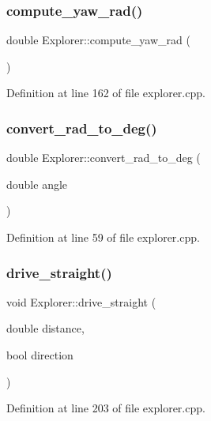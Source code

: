 \subsubsection{\texorpdfstring{compute\+\_\+yaw\+\_\+rad()}{compute\_yaw\_rad()}}
{\footnotesize\ttfamily double Explorer\+::compute\+\_\+yaw\+\_\+rad (\begin{DoxyParamCaption}{ }\end{DoxyParamCaption})}



Definition at line 162 of file explorer.\+cpp.

\mbox{\label{class_explorer_ac3a5c9368647dd9d2c36d12497bd889e}} 
\subsubsection{\texorpdfstring{convert\+\_\+rad\+\_\+to\+\_\+deg()}{convert\_rad\_to\_deg()}}
{\footnotesize\ttfamily double Explorer\+::convert\+\_\+rad\+\_\+to\+\_\+deg (\begin{DoxyParamCaption}\item[{double}]{angle }\end{DoxyParamCaption})}



Definition at line 59 of file explorer.\+cpp.

\mbox{\label{class_explorer_ab4ca9f16c48a60fc4d0e426b6fd9e9a0}} 
\subsubsection{\texorpdfstring{drive\+\_\+straight()}{drive\_straight()}}
{\footnotesize\ttfamily void Explorer\+::drive\+\_\+straight (\begin{DoxyParamCaption}\item[{double}]{distance,  }\item[{bool}]{direction }\end{DoxyParamCaption})}



Definition at line 203 of file explorer.\+cpp.

